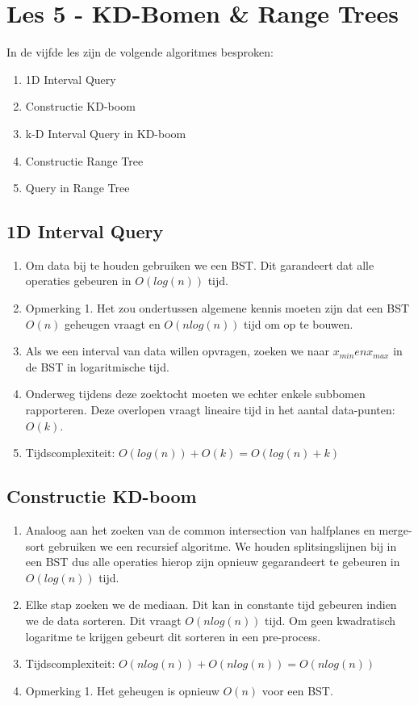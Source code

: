 \documentclass[12pt,a4paper]{article}
\begin{document}
	\section{Les 5 - KD-Bomen \& Range Trees}
		In de vijfde les zijn de volgende algoritmes besproken:
		\begin{enumerate}
			\item 1D Interval Query
			\item Constructie KD-boom
			\item k-D Interval Query in KD-boom
			\item Constructie Range Tree
			\item Query in Range Tree
		\end{enumerate}   
	
		\subsection{1D Interval Query}
			\begin{enumerate}
				\item Om data bij te houden gebruiken we een BST. Dit garandeert dat alle operaties gebeuren in $O(log (n))$ tijd.
				\item Opmerking 1. Het zou ondertussen algemene kennis moeten zijn dat een BST $O(n)$ geheugen vraagt en $O(n log (n))$ tijd om op te bouwen.
				\item Als we een interval van data willen opvragen, zoeken we naar $x_{min} en x_{max}$ in de BST in logaritmische tijd. 
				\item Onderweg tijdens deze zoektocht moeten we echter enkele subbomen rapporteren. Deze overlopen vraagt lineaire tijd in het aantal data-punten: $O(k)$. 
				\item Tijdscomplexiteit: $O(log (n)) + O(k) = O(log (n) + k)$
			\end{enumerate}
		
		\subsection{Constructie KD-boom}
		\begin{enumerate}
			\item Analoog aan het zoeken van de common intersection van halfplanes en merge-sort gebruiken we een recursief algoritme. We houden splitsingslijnen bij in een BST dus alle operaties hierop zijn opnieuw gegarandeert te gebeuren in $O(log (n))$ tijd. 
			\item Elke stap zoeken we de mediaan. Dit kan in constante tijd gebeuren indien we de data sorteren. Dit vraagt $O(n log (n))$ tijd. Om geen kwadratisch logaritme te krijgen gebeurt dit sorteren in een pre-process. 
			\item Tijdscomplexiteit: $O(n log (n)) + O(n log (n)) = O(n log (n))$
			\item Opmerking 1. Het geheugen is opnieuw $O(n)$ voor een BST. 
		\end{enumerate}
	
\end{document}
